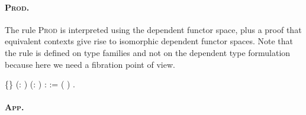 \paragraph{\textsc{Prod}.} The rule \textsc{Prod} is interpreted
  using the dependent functor space, plus a proof that equivalent
  contexts give rise to isomorphic dependent functor spaces.  Note that
  the rule is defined on type families and not on the dependent type
  formulation because here we need a fibration point of view. \begin{coqdoccode}
\coqdocemptyline
\coqdocnoindent
{}  \{\} (: ) (: ) \coqdoceol
\coqdocindent{1.00em}
:   := \coqdocnotation{(}   ( \coqdocnotation{$\star$} )\coqdocnotation{;}   \coqdocnotation{)}.\coqdoceol
\coqdocemptyline
\end{coqdoccode}
  \paragraph{\textsc{App}.}


